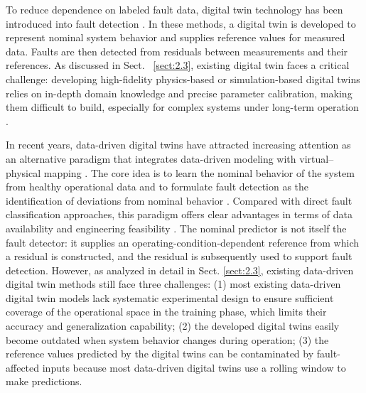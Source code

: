 \documentclass[a4paper,10pt]{cas-sc}%
\newcommand{\rev}[1]{\textcolor{revisionred}{#1}}
\begin{document}
To reduce dependence on labeled fault data, digital twin technology has been introduced into fault detection \citep{hosamo2022review, darvishi2020sensor}. In these methods, a digital twin is developed to represent nominal system behavior and supplies reference values for measured data. Faults are then detected from residuals between measurements and their references. As discussed in Sect. ~\ref{sect:2.3}, existing digital twin faces a critical challenge: developing high-fidelity physics-based or simulation-based digital twins relies on in-depth domain knowledge and precise parameter calibration, making them difficult to build, especially for complex systems under long-term operation \citep{HU2025102963, YOU20221471}.

In recent years, data-driven digital twins have attracted increasing attention as an alternative paradigm that integrates data-driven modeling with virtual--physical mapping \citep{teng2021recent, friederich2022framework, 10477658, hui2022digital}. The core idea is to learn the nominal behavior of the system from healthy operational data and to formulate fault detection as the identification of deviations from nominal behavior \citep{Michau_2019}. Compared with direct fault classification approaches, this paradigm offers clear advantages in terms of data availability and engineering feasibility \citep{ZHONG2023e14534}. \rev{The nominal predictor is not itself the fault detector: it supplies an operating-condition-dependent reference from which a residual is constructed, and the residual is subsequently used to support fault detection.} However, as analyzed in detail in Sect. \ref{sect:2.3}, existing data-driven digital twin methods still face three challenges: (1) most existing data-driven digital twin models lack systematic experimental design to ensure sufficient coverage of the operational space in the training phase, which limits their accuracy and generalization capability; (2) the developed digital twins easily become outdated when system behavior changes during operation; (3) the reference values predicted by the digital twins can be contaminated by fault-affected inputs because most data-driven digital twins use a rolling window to make predictions.
\end{document}

